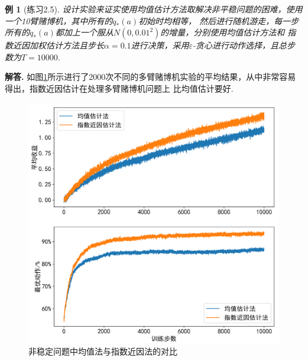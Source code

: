 \documentclass[12pt, a4paper, oneside]{ctexart}
\newtheorem{example}{例}            %
\numberwithin{equation}{section}  %
\newenvironment{solution}[1][]{\par\noindent\textbf{#1解答. }}{\smallskip\par}  %
\begin{document}
\begin{example}[练习2.5]
    设计实验来证实使用均值估计方法取解决非平稳问题的困难，使用一个10臂赌博机，其中所有的$q_*(a)$初始时均相等，
    然后进行随机游走，每一步所有的$q_*(a)$都加上一个服从$N(0,0.01^2)$的增量，分别使用均值估计方法和
    指数近因加权估计方法且步长$\alpha=0.1$进行决策，采用$\varepsilon$-贪心进行动作选择，且总步数为$T=10000$.
\end{example}
\begin{solution}
    如图\ref{fig-averge_recency}所示进行了2000次不同的多臂赌博机实验的平均结果，从中非常容易得出，指数近因估计在处理多臂赌博机问题上
    比均值估计要好.
\end{solution}
\begin{figure}[htbp]
    \centering
    \includegraphics[scale=0.13]{../figures/033页练习2.5.png}
    \caption{非稳定问题中均值法与指数近因法的对比}
    \label{fig-averge_recency}
\end{figure}
\end{document}
